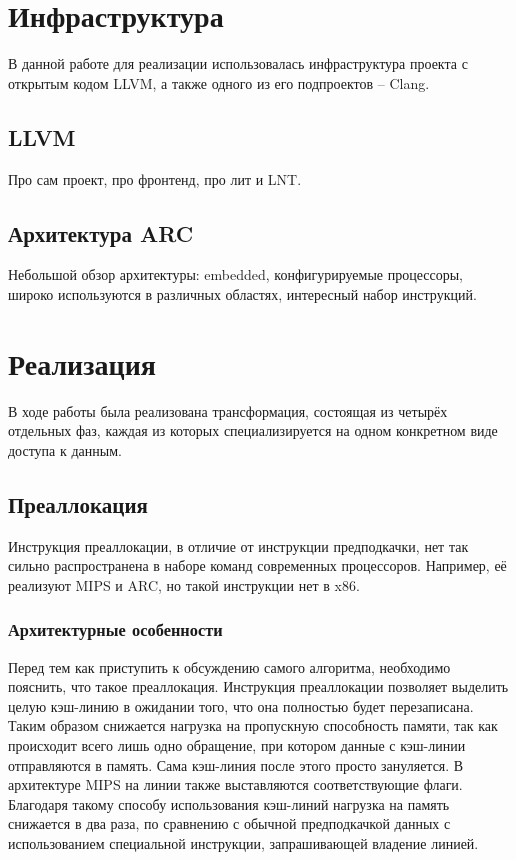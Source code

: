 \documentclass[12pt,a4paper]{article}
\begin{document}
\section{Инфраструктура}

В данной работе для реализации использовалась инфраструктура проекта с открытым кодом LLVM, а также одного из его подпроектов -- Clang\cite{LLVM}.

\subsection{LLVM}

Про сам проект, про фронтенд, про лит и LNT.

\subsection{Архитектура ARC}

Небольшой обзор архитектуры: embedded, конфигурируемые процессоры, широко используются в различных областях, интересный набор инструкций.

\section{Реализация}

\indent

В ходе работы была реализована трансформация, состоящая из четырёх отдельных фаз, каждая из которых специализируется на одном конкретном виде доступа к данным.

\subsection{Преаллокация}

\indent

Инструкция преаллокации, в отличие от инструкции предподкачки, нет так сильно распространена в наборе команд современных процессоров. Например, её реализуют MIPS\cite{MIPS} и ARC, но такой инструкции нет в x86.

\subsubsection{Архитектурные особенности}

\indent

Перед тем как приступить к обсуждению самого алгоритма, необходимо пояснить, что такое преаллокация. Инструкция преаллокации позволяет выделить целую кэш-линию в ожидании того, что она полностью будет перезаписана. Таким образом снижается нагрузка на пропускную способность памяти, так как происходит всего лишь одно обращение, при котором данные с кэш-линии отправляются в память. Сама кэш-линия после этого просто зануляется. В архитектуре MIPS на линии также выставляются соответствующие флаги. Благодаря такому способу использования кэш-линий нагрузка на память снижается в два раза, по сравнению с обычной предподкачкой данных с использованием специальной инструкции, запрашивающей владение линией.
\end{document}
